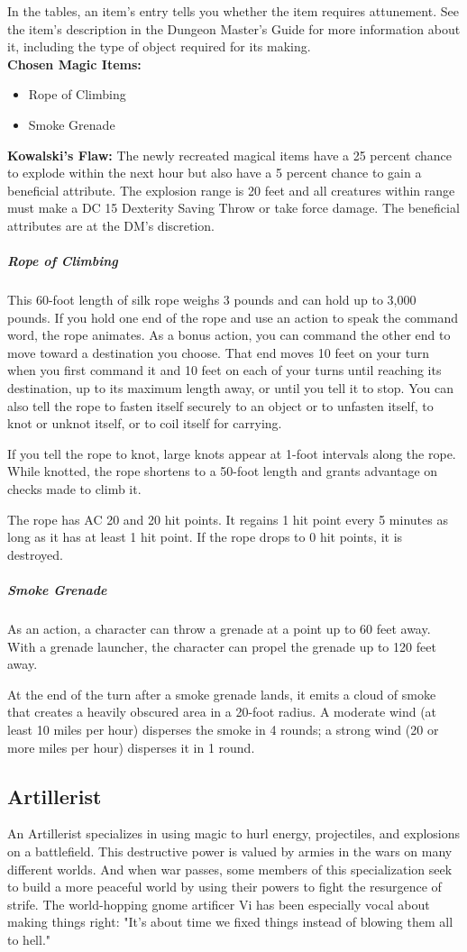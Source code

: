 {In the tables, an item's entry tells you whether the item requires attunement. See the item's description in the Dungeon Master's Guide for more information about it, including the type of object required for its making.\\
\textbf{Chosen Magic Items:}
\begin{itemize}
	\item Rope of Climbing
	\item Smoke Grenade
\end{itemize}
\textbf{Kowalski's Flaw:} The newly recreated magical items have a 25 percent chance to explode within the next hour but also have a 5 percent chance to gain a beneficial attribute. The explosion range is 20 feet and all creatures within range must make a DC 15 Dexterity Saving Throw or take  force damage. The beneficial attributes are at the DM's discretion.\\
\subparagraph*{Rope of Climbing}
This 60-foot length of silk rope weighs 3 pounds and can hold up to 3,000 pounds. If you hold one end of the rope and use an action to speak the command word, the rope animates. As a bonus action, you can command the other end to move toward a destination you choose. That end moves 10 feet on your turn when you first command it and 10 feet on each of your turns until reaching its destination, up to its maximum length away, or until you tell it to stop. You can also tell the rope to fasten itself securely to an object or to unfasten itself, to knot or unknot itself, or to coil itself for carrying.

If you tell the rope to knot, large knots appear at 1-foot intervals along the rope. While knotted, the rope shortens to a 50-foot length and grants advantage on checks made to climb it.

The rope has AC 20 and 20 hit points. It regains 1 hit point every 5 minutes as long as it has at least 1 hit point. If the rope drops to 0 hit points, it is destroyed.\\
\subparagraph*{Smoke Grenade}
As an action, a character can throw a grenade at a point up to 60 feet away. With a grenade launcher, the character can propel the grenade up to 120 feet away.

At the end of the turn after a smoke grenade lands, it emits a cloud of smoke that creates a heavily obscured area in a 20-foot radius. A moderate wind (at least 10 miles per hour) disperses the smoke in 4 rounds; a strong wind (20 or more miles per hour) disperses it in 1 round.
\subsection*{Artillerist}
An Artillerist specializes in using magic to hurl energy, projectiles, and explosions on a battlefield. This destructive power is valued by armies in the wars on many different worlds. And when war passes, some members of this specialization seek to build a more peaceful world by using their powers to fight the resurgence of strife. The world-hopping gnome artificer Vi has been especially vocal about making things right: "It's about time we fixed things instead of blowing them all to hell."
}
